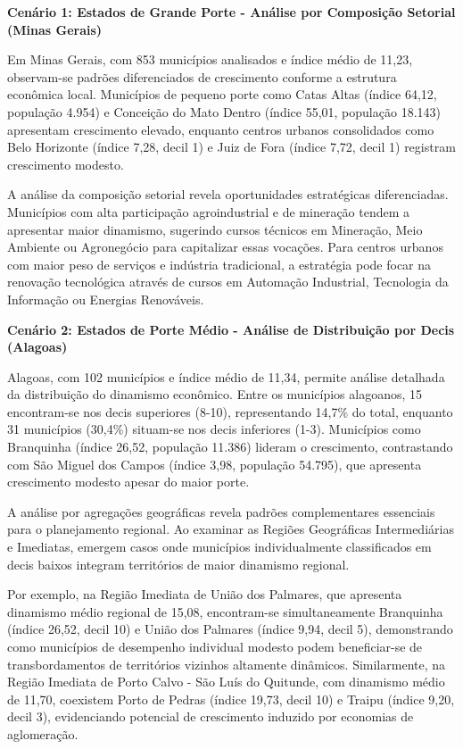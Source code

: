 \textbf{Cenário 1: Estados de Grande Porte - Análise por Composição Setorial (Minas Gerais)}

Em Minas Gerais, com 853 municípios analisados e índice médio de 11,23, observam-se padrões diferenciados de crescimento conforme a estrutura econômica local. Municípios de pequeno porte como Catas Altas (índice 64,12, população 4.954) e Conceição do Mato Dentro (índice 55,01, população 18.143) apresentam crescimento elevado, enquanto centros urbanos consolidados como Belo Horizonte (índice 7,28, decil 1) e Juiz de Fora (índice 7,72, decil 1) registram crescimento modesto.

A análise da composição setorial revela oportunidades estratégicas diferenciadas. Municípios com alta participação agroindustrial e de mineração tendem a apresentar maior dinamismo, sugerindo cursos técnicos em Mineração, Meio Ambiente ou Agronegócio para capitalizar essas vocações. Para centros urbanos com maior peso de serviços e indústria tradicional, a estratégia pode focar na renovação tecnológica através de cursos em Automação Industrial, Tecnologia da Informação ou Energias Renováveis.

\textbf{Cenário 2: Estados de Porte Médio - Análise de Distribuição por Decis (Alagoas)}

Alagoas, com 102 municípios e índice médio de 11,34, permite análise detalhada da distribuição do dinamismo econômico. Entre os municípios alagoanos, 15 encontram-se nos decis superiores (8-10), representando 14,7\% do total, enquanto 31 municípios (30,4\%) situam-se nos decis inferiores (1-3). Municípios como Branquinha (índice 26,52, população 11.386) lideram o crescimento, contrastando com São Miguel dos Campos (índice 3,98, população 54.795), que apresenta crescimento modesto apesar do maior porte.

A análise por agregações geográficas revela padrões complementares essenciais para o planejamento regional. Ao examinar as Regiões Geográficas Intermediárias e Imediatas, emergem casos onde municípios individualmente classificados em decis baixos integram territórios de maior dinamismo regional. 

Por exemplo, na Região Imediata de União dos Palmares, que apresenta dinamismo médio regional de 15,08, encontram-se simultaneamente Branquinha (índice 26,52, decil 10) e União dos Palmares (índice 9,94, decil 5), demonstrando como municípios de desempenho individual modesto podem beneficiar-se de transbordamentos de territórios vizinhos altamente dinâmicos. Similarmente, na Região Imediata de Porto Calvo - São Luís do Quitunde, com dinamismo médio de 11,70, coexistem Porto de Pedras (índice 19,73, decil 10) e Traipu (índice 9,20, decil 3), evidenciando potencial de crescimento induzido por economias de aglomeração.

